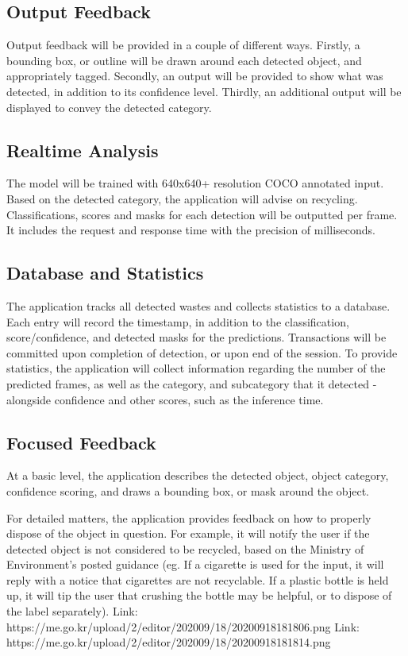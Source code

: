 \documentclass[conference]{IEEEtran}
\begin{document}
\subsection{Output Feedback}
Output feedback will be provided in a couple of different ways. Firstly, a bounding box, or outline will be drawn around each detected object, and appropriately tagged. Secondly, an output will be provided to show what was detected, in addition to its confidence level. Thirdly, an additional output will be displayed to convey the detected category.

\subsection{Realtime Analysis}
The model will be trained with 640x640+ resolution COCO annotated input. Based on the detected category, the application will advise on recycling. Classifications, scores and masks for each detection will be outputted per frame. It includes the request and response time with the precision of milliseconds. 

\subsection{Database and Statistics}
The application tracks all detected wastes and collects statistics to a database. Each entry will record the timestamp, in addition to the classification, score/confidence, and detected masks for the predictions. Transactions will be committed upon completion of detection, or upon end of the session.
\newline
To provide statistics, the application will collect information regarding the number of the predicted frames, as well as the category, and subcategory that it detected - alongside confidence and other scores, such as the inference time.

\subsection{Focused Feedback}
At a basic level, the application describes the detected object, object category, confidence scoring, and draws a bounding box, or mask around the object.

For detailed matters, the application provides feedback on how to properly dispose of the object in question. For example, it will notify the user if the detected object is not considered to be recycled, based on the Ministry of Environment's posted guidance (eg. If a cigarette is used for the input, it will reply with a notice that cigarettes are not recyclable. If a plastic bottle is held up, it will tip the user that crushing the bottle may be helpful, or to dispose of the label separately).
\newline
\newline
Link: https://me.go.kr/upload/2/editor/202009/18/20200918181806.png
\newline
Link: https://me.go.kr/upload/2/editor/202009/18/20200918181814.png
\end{document}
